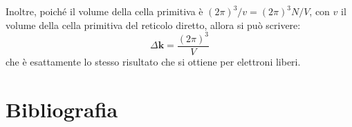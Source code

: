 Inoltre, poiché il volume della cella primitiva è $ (2\pi)^3/v = (2\pi)^3N/V $, con $ v $ il volume della cella primitiva del reticolo diretto, allora si può scrivere:
\[ \Delta \textbf{k} = \frac{(2\pi)^3}{V} \]
che è esattamente lo stesso risultato che si ottiene per elettroni liberi.

\section{Bibliografia}